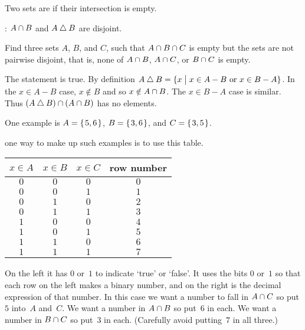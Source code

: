 \documentclass{ibl}
\begin{document}
\begin{df}
Two sets are  if their intersection is empty.  
\end{df}

\begin{ex}
\begin{exes}
\item \pord: $A\cap B$ and $A\mathbin{\triangle} B$ are disjoint.  
\item Find three sets $A$, $B$, and $C$, such that 
$A\cap B\cap C$ is empty but the sets are
not pairwise disjoint, that is, none of $A\cap B$, 
$A\cap C$, or $B\cap C$ is empty. 
\end{exes}
\begin{ans}
\begin{exes}
\item The statement is true.
  By definition $A\mathbin{\triangle} B=\{x \bigm| \text{$x\in A-B$ or $x\in B-A$}\}$.
  In the $x\in A-B$ case, $x\notin B$ and so $x\notin A\cap B$.
  The $x\in B-A$ case is similar.
  Thus $(A\mathbin{\triangle} B)\cap (A\cap B)$ has no elements.
\item One example is $A=\mbox{$\{\hspace{0.1em}5,6\hspace{0.1em}\}$}$, $B=\mbox{$\{\hspace{0.1em}3,6\hspace{0.1em}\}$}$, and 
  $C=\mbox{$\{\hspace{0.1em}3,5\hspace{0.1em}\}$}$.

  \remark
  one way to make up such examples is to use this table.
  \begin{center}
    \begin{tabular}{ccc|c}
      $x\in A$  &$x\in B$  &$x\in C$  &row number \\ \hline
         $0$    &$0$       &$0$       &$0$    \\
         $0$    &$0$       &$1$       &$1$    \\
         $0$    &$1$       &$0$       &$2$    \\
         $0$    &$1$       &$1$       &$3$    \\[.5ex]
         $1$    &$0$       &$0$       &$4$    \\
         $1$    &$0$       &$1$       &$5$    \\
         $1$    &$1$       &$0$       &$6$    \\
         $1$    &$1$       &$1$       &$7$    
    \end{tabular}
  \end{center}
  On the left it has $0$ or~$1$ to indicate `true' or `false'.
  It uses the bits $0$ or~$1$ so that each row on the left makes a 
  binary number, and on the 
  right is the decimal expression of that number.
  In this case we want a number to fall in $A\cap C$ so put
  $5$ into~$A$ and~$C$.
  We want a number in $A\cap B$ so put~$6$ in each.
  We want a number in $B\cap C$ so put~$3$ in each.
  (Carefully avoid putting~$7$ in all three.)
\end{exes}
\end{ans}
\end{ex}
\end{document}
